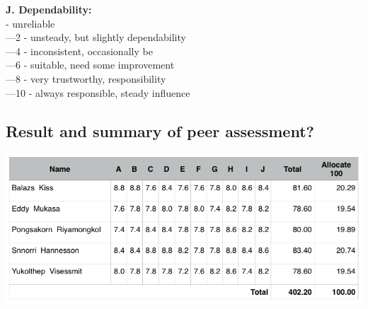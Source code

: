 \documentclass[11pt]{article}
\begin{document}
\textbf{J. Dependability:}\\ 
	\indent{}	- unreliable\\
	\indent{}—2	- unsteady, but slightly dependability \\
	\indent{}—4	- inconsistent, occasionally be\\
	\indent{}—6	- suitable, need some improvement \\
	\indent{}—8	- very trustworthy, responsibility \\
	\indent{}—10	- always responsible, steady influence \\

\subsection{Result and summary of peer assessment?}
\begin{center}			
\includegraphics[scale = 0.5]{Figure04}
\end{center}

\newpage	




\newpage	

\appendix


\end{document}
